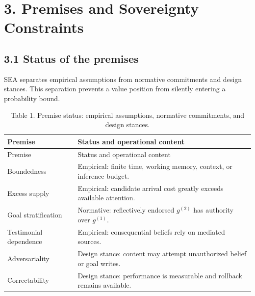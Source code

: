 \documentclass[
  11pt]{article}
\begin{document}
\section{3. Premises and Sovereignty Constraints}\label{premises-and-sovereignty-constraints}

\subsection{3.1 Status of the premises}\label{status-of-the-premises}

SEA separates empirical assumptions from normative commitments and design stances. This separation prevents a value position from silently entering a probability bound.

\begin{longtable}[]{@{}
  >{\raggedright\arraybackslash}p{}
  >{\raggedright\arraybackslash}p{}@{}}
\caption{Table 1. Premise status: empirical assumptions, normative commitments, and design stances.}\tabularnewline
\toprule\noalign{}
\begin{minipage}[b]{\linewidth}\raggedright
Premise
\end{minipage} & \begin{minipage}[b]{\linewidth}\raggedright
Status and operational content
\end{minipage} \\
\midrule\noalign{}
\endfirsthead
\toprule\noalign{}
\begin{minipage}[b]{\linewidth}\raggedright
Premise
\end{minipage} & \begin{minipage}[b]{\linewidth}\raggedright
Status and operational content
\end{minipage} \\
\midrule\noalign{}
\endhead
\bottomrule\noalign{}
\endlastfoot
Boundedness & Empirical: finite time, working memory, context, or inference budget. \\
Excess supply & Empirical: candidate arrival cost greatly exceeds available attention. \\
Goal stratification & Normative: reflectively endorsed \(g^{(2)}\) has authority over \(g^{(1)}\). \\
Testimonial dependence & Empirical: consequential beliefs rely on mediated sources. \\
Adversariality & Design stance: content may attempt unauthorized belief or goal writes. \\
Correctability & Design stance: performance is measurable and rollback remains available. \\
\end{longtable}
\end{document}
